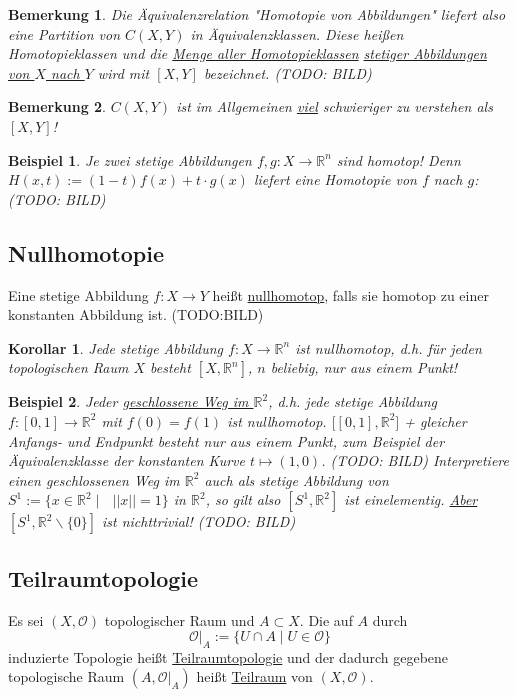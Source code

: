 \documentclass[a4paper,11pt,notitlepage]{report}
\newtheorem{corollary}{Korollar}[chapter]
\newtheorem{remark}{Bemerkung}[chapter]
\newtheorem{example}{Beispiel}[chapter]
\newcommand{\R}{{\ensuremath{\mathbb{R}}}}
\newcommand{\OO}{{\ensuremath{\mathcal{O}}}}
\newenvironment{Kasten}[1]
{
\hspace{0.05\linewidth}
\begin{center}
\begin{minipage}{0.9\linewidth}
\setlength{\fboxsep}{10pt}
\definecolor{shadecolor}{gray}{1}
\definecolor{framecolor}{gray}{0}
\def\FrameCommand{\fcolorbox{framecolor}{shadecolor}}
\MakeFramed {\FrameRestore}
\subsection{#1}
\begin{itshape}
}
{
\end{itshape}
\endMakeFramed
\end{minipage}
\end{center}
}
\begin{document}
\begin{remark}
Die Äquivalenzrelation "Homotopie von Abbildungen" liefert also eine Partition von $C(X,Y)$ in Äquivalenzklassen. Diese heißen Homotopieklassen und die \underline{Menge aller Homotopieklassen} \underline{stetiger Abbildungen} \underline{von $X$ nach $Y$} wird mit $[X,Y]$ bezeichnet.
(TODO: BILD)
\end{remark}

\begin{remark}
$C(X,Y)$ ist im Allgemeinen \underline{\underline{viel}} schwieriger zu verstehen als $[X,Y]$!
\end{remark}

\begin{example}
Je zwei stetige Abbildungen $f,g \colon X \rightarrow \R^n$ sind homotop! Denn $H(x,t):= (1-t) f(x) + t \cdot g(x)$ liefert eine Homotopie von $f$ nach $g$: (TODO: BILD)
\end{example}

\begin{Kasten}{Nullhomotopie}
Eine stetige Abbildung $f \colon X \rightarrow Y$ heißt \underline{nullhomotop}, falls sie homotop zu einer konstanten Abbildung ist. (TODO:BILD)
\end{Kasten}

\begin{corollary}
Jede stetige Abbildung $f \colon X \rightarrow \R^n$ ist nullhomotop, d.h. für jeden topologischen Raum $X$ besteht $[X, \R^n]$, $n$ beliebig, nur aus einem Punkt!
\end{corollary}

\begin{example}
Jeder \underline{geschlossene Weg im $\R^2$}, d.h. jede stetige Abbildung $f \colon [0,1] \rightarrow \R^2$ mit $f(0) = f(1)$ ist nullhomotop.
$\bigl[[0,1], \R^2\bigr]$ + gleicher Anfangs- und Endpunkt besteht nur aus einem Punkt, zum Beispiel der Äquivalenzklasse der konstanten Kurve $t \mapsto (1,0)$. (TODO: BILD)
Interpretiere einen geschlossenen Weg im $\R^2$ auch als stetige Abbildung von $S^1 := \{ x \in \R^2 \mid \text{ } ||x|| = 1\}$ in $\R^2$, so gilt also $[S^1, \R^2]$ ist einelementig.
\newline
\underline{Aber} $[S^1, \R^2 \backslash \{0\}]$ ist nichttrivial! (TODO: BILD)
\end{example}

\begin{Kasten}{Teilraumtopologie}
Es sei $(X, \OO)$ topologischer Raum und $A \subset X$. Die auf $A$ durch
$$\OO \Big |_{A} := \{U \cap A \mid U \in \OO \}$$
induzierte Topologie heißt \underline{Teilraumtopologie} und der dadurch gegebene topologische Raum $(A, \OO \Big |_{A})$ heißt \underline{Teilraum} von $(X, \OO)$.
\end{Kasten}
\end{document}
